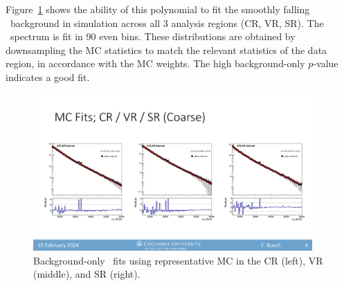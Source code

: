 Figure~\ref{fig:bkgfit_mc} shows the ability of this polynomial to fit the smoothly falling \mt~background in simulation across all 3 analysis regions (CR, VR, SR).
The \mt~spectrum is fit in 90 even bins.
These distributions are obtained by downsampling the MC statistics to match the relevant statistics of the data region, in accordance with the MC weights.
The high background-only $p$-value indicates a good fit.
\begin{figure}[!htbp]
\centering
   \includegraphics[width=0.95\textwidth]{figures/stats/bkgfit_mc}
    \caption{Background-only \mt~fits using representative MC in the CR (left), VR (middle), and SR (right).
    \label{fig:bkgfit_mc}}
\end{figure}

